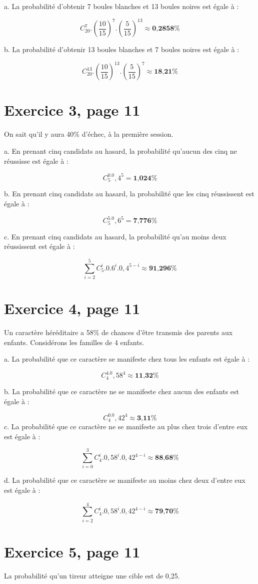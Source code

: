 \documentclass[10pt]{article}
\begin{document}
a. La probabilité d'obtenir 7 boules blanches et 13 boules noires est égale à :

$$C_{20}^7.\left(\frac{10}{15}\right)^7.\left(\frac{5}{15}\right)^{13}\approx\textbf{0,2858\%}$$

b. La probabilité d'obtenir 13 boules blanches et 7 boules noires est égale à :

$$C_{20}^{13}.\left(\frac{10}{15}\right)^{13}.\left(\frac{5}{15}\right)^7\approx\textbf{18,21\%}$$
\section*{Exercice 3, page 11}
On sait qu'il y aura 40\% d'échec, à la première session.

a. En prenant cinq candidats au hasard, la probabilité qu'aucun des cinq ne réussisse est égale à :

$$C_5^0.0,4^5=\textbf{1,024\%}$$

b. En prenant cinq candidats au hasard, la probabilité que les cinq réussissent est égale à :

$$C_5^5.0,6^5=\textbf{7,776\%}$$

c. En prenant cinq candidats au hasard, la probabilité qu'au moins deux réussissent est égale à :

$$\sum_{i=2}^5C_5^i.0.6^i.0,4^{5-i}\approx\textbf{91,296\%}$$
\section*{Exercice 4, page 11}
Un caractère héréditaire a 58\% de chances d'être transmis des parents aux enfants. Considérons les familles de 4 enfants.

a. La probabilité que ce caractère se manifeste chez tous les enfants est égale à :

$$C_4^4.0,58^4\approx\textbf{11,32\%}$$

b. La probabilité que ce caractère ne se manifeste chez aucun des enfants est égale à :

$$C_4^0.0,42^4\approx\textbf{3,11\%}$$
\newpage
c. La probabilité que ce caractère ne se manifeste au plus chez trois d'entre eux est égale à :

$$\sum_{i=0}^3C_4^i.0,58^i.0,42^{4-i}\approx\textbf{88,68\%}$$

d. La probabilité que ce caractère se manifeste au moins chez deux d'entre eux est égale à :

$$\sum_{i=2}^4C_4^i.0,58^i.0,42^{4-i}\approx\textbf{79,70\%}$$
\section*{Exercice 5, page 11}
La probabilité qu'un tireur atteigne une cible est de 0,25.
\end{document}
